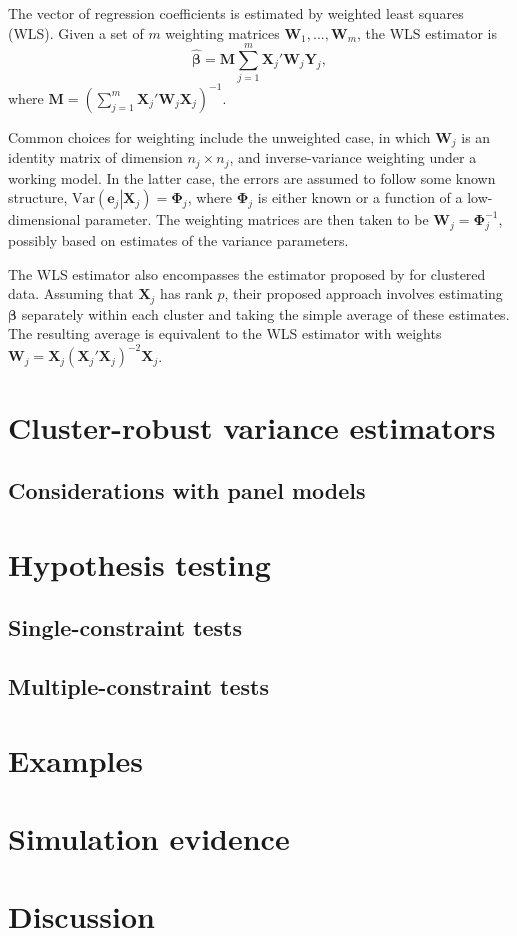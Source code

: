\documentclass[man, noextraspace, floatsintext]{apa6}\usepackage[]{graphicx}\usepackage[]{color}
\newcommand{\bibfile}{bibliography}
\newcommand{\Var}{\text{Var}}
\newcommand{\bM}{\mathbf}
\newcommand{\bS}{\boldsymbol}
\begin{document}
The vector of regression coefficients is estimated by weighted least squares (WLS). Given a set of $m$ weighting matrices $\bM{W}_1,...,\bM{W}_m$, the WLS estimator is 
\begin{equation}
\label{eq:WLS}
\bS{\hat\beta} = \bM{M} \sum_{j=1}^m \bM{X}_j' \bM{W}_j \bM{Y}_j, 
\end{equation}
where $\bM{M} = \left(\sum_{j=1}^m \bM{X}_j' \bM{W}_j \bm{X}_j\right)^{-1}$.

Common choices for weighting include the unweighted case, in which $\bM{W}_j$ is an identity matrix of dimension $n_j \times n_j$, and inverse-variance weighting under a working model. In the latter case, the errors are assumed to follow some known structure, $\Var\left(\bM{e}_j\left|\bM{X}_j\right.\right) = \bS\Phi_j$, where $\bS\Phi_j$ is either known or a function of a low-dimensional parameter. The weighting matrices are then taken to be $\bM{W}_j = \bS\Phi_j^{-1}$, possibly based on estimates of the variance parameters. 

The WLS estimator also encompasses the estimator proposed by \citet{Ibragimov2010tstatistic} for clustered data. Assuming that $\bM{X}_j$ has rank $p$, their proposed approach involves estimating $\bS\beta$ separately within each cluster and taking the simple average of these estimates. The resulting average is equivalent to the WLS estimator with weights $\bM{W}_j = \bM{X}_j \left(\bM{X}_j'\bM{X}_j\right)^{-2} \bM{X}_j$.

\section{Cluster-robust variance estimators}

\subsection{Considerations with panel models}

\section{Hypothesis testing}

\subsection{Single-constraint tests}

\subsection{Multiple-constraint tests}

\section{Examples}

\section{Simulation evidence}

\section{Discussion}



\end{document}
